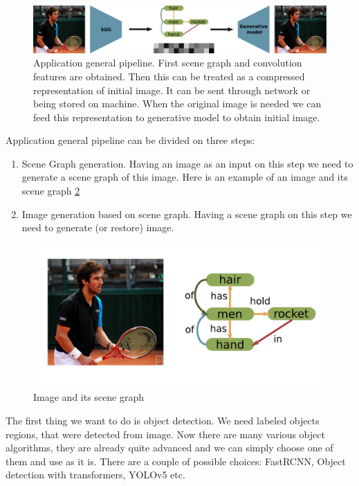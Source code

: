\begin{figure}
    \centering
    \includegraphics[width=\textwidth]{figure/application-general-pipeline.png}
    \caption{Application general pipeline. First scene graph and convolution features are obtained. Then this can be treated as a compressed representation of initial image. It can be sent through network or being stored on machine. When the original image is needed we can feed this representation to generative model to obtain initial image.}
    \label{application-general-pipeline}
\end{figure}

Application general pipeline can be divided on three steps:

\begin{enumerate}
    \item Scene Graph generation. Having an image as an input on this step we need to generate a scene graph of this image. Here is an example of an image and its scene graph \ref{image-and-scene-graph}
    \item Image generation based on scene graph. Having a scene graph on this step we need to generate (or restore) image.
\end{enumerate}

\begin{figure}[!h]
    \centering
    \includegraphics[width=\textwidth]{figure/image-and-scene-graph.png}
    \caption{Image and its scene graph}
    \label{image-and-scene-graph}
\end{figure}

The first thing we want to do is object detection. We need labeled objects regions, that were detected from image. Now there are many various object algorithms, they are already quite advanced and we can simply choose one of them and use as it is. There are a couple of possible choices: FastRCNN, Object detection with transformers, YOLOv5 etc.


